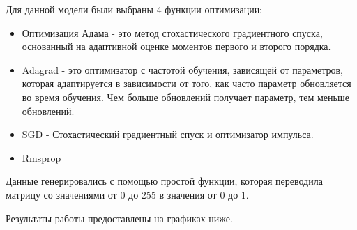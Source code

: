 \begin{figure}[H]
\end{figure}

Для данной модели были выбраны 4 функции оптимизации:

\begin{itemize}
	\item Оптимизация Адама - это метод стохастического градиентного спуска, основанный на адаптивной оценке моментов первого и второго порядка.
	\item Adagrad - это оптимизатор с частотой обучения, зависящей от параметров, которая адаптируется в зависимости от того, как часто параметр обновляется во время обучения. Чем больше обновлений получает параметр, тем меньше обновлений.
	\item SGD - Стохастический градиентный спуск и оптимизатор импульса.
	\item Rmsprop
\end{itemize}

Данные генерировались с помощью простой функции, которая переводила матрицу со значениями от 0 до 255 в значения от 0 до 1.

Результаты работы предоставлены на графиках ниже.

\begin{figure}[H]
\end{figure}

